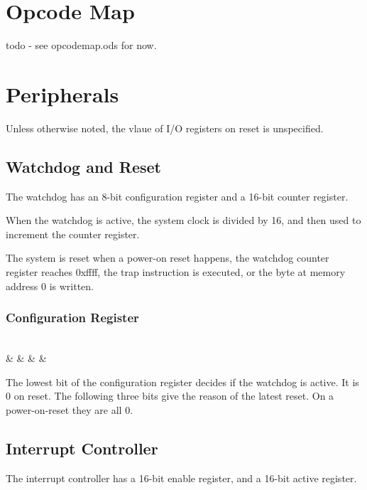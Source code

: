 \documentclass{book}
\begin{document}
\chapter{Opcode Map}

todo - see opcodemap.ods for now.

\chapter{Peripherals}

Unless otherwise noted, the vlaue of I/O registers on reset is unspecified.

\section{Watchdog and Reset}

The watchdog has an 8-bit configuration register and a 16-bit counter register.

When the watchdog is active, the system clock is divided by 16, and then used to increment the counter register.

The system is reset when a power-on reset happens, the watchdog counter register reaches 0xffff, the trap instruction is executed, or the byte at memory address 0 is written.

\subsection*{Configuration Register}

\vspace{3mm}
\begin{bytefield}[bitwidth=0.13\linewidth]{8}
	 \\
	 &  &  &  & 
\end{bytefield}

The lowest bit of the configuration register decides if the watchdog is active. It is 0 on reset. The following three bits give the reason of the latest reset. On a power-on-reset they are all 0.

\section{Interrupt Controller}

The interrupt controller has a 16-bit enable register, and a 16-bit active register.
\end{document}
